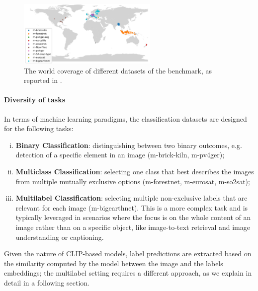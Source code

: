 \documentclass[a4paper, twoside, english]{sapthesis} %
\begin{document}
\begin{figure}[h]
    \centering
    \includegraphics[width=0.6\textwidth]{img/geobench_world_coverage.png}
    \caption{\normalsize The world coverage of different datasets of the benchmark, as reported in \cite{lacoste2023geo}.}
    \label{fig:geoworld}
\end{figure}

\paragraph{Diversity of tasks}

In terms of machine learning paradigms, the classification datasets are designed for the following tasks:
\begin{enumerate}[i)]
    \item \textbf{Binary Classification}: distinguishing between two binary outcomes, e.g. detection of a specific element in an image (m-brick-kiln, m-pv4ger);
    \item \textbf{Multiclass Classification}: selecting one class that best describes the images from multiple mutually exclusive options (m-forestnet, m-eurosat, m-so2sat);
    \item \textbf{Multilabel Classification}: selecting multiple non-exclusive labels that are relevant for each image (m-bigearthnet). This is a more complex task and is typically leveraged in scenarios where the focus is on the whole content of an image rather than on a specific object, like image-to-text retrieval and image understanding or captioning. 
\end{enumerate}
Given the nature of CLIP-based models, label predictions are extracted based on the similarity computed by the model between the image and the labels embeddings; the multilabel setting requires a different approach, as we explain in detail in a following section.

\vspace{0.5cm}
\end{document}
